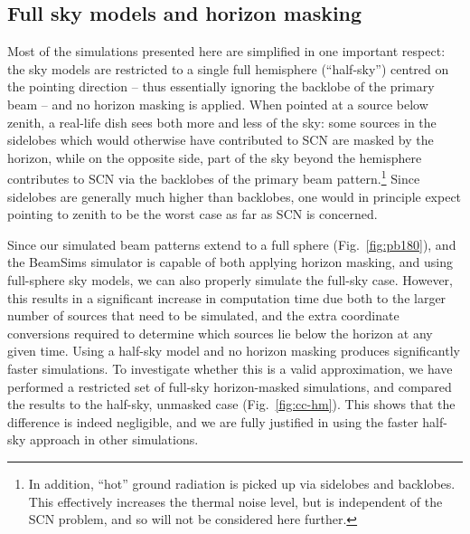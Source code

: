 \documentclass{aa}
\begin{document}
\subsection{Full sky models and horizon masking}
\label{sec:horizon-masking}

Most of the simulations presented here are simplified in one important respect: the sky models are restricted to a single full hemisphere (``half-sky'') centred on the pointing direction -- thus essentially ignoring the backlobe of the primary beam -- and no horizon masking is applied. When pointed at a source below zenith, a real-life dish sees both more and less of the sky: some sources in the sidelobes which would otherwise have contributed to SCN are masked by the horizon, while on the opposite side, part of the sky beyond the hemisphere contributes to SCN via the backlobes of the primary beam pattern.\footnote{In addition, ``hot'' ground radiation is picked up via sidelobes and backlobes. This effectively increases the thermal noise level, but is independent of the SCN problem, and so will not be considered here further.} Since sidelobes are generally much higher than backlobes, one would in principle expect pointing to zenith to be the worst case as far as SCN is concerned. 

Since our simulated beam patterns extend to a full sphere (Fig.~\ref{fig:pb180}), and the BeamSims simulator is capable of both applying horizon masking, and using full-sphere sky models, we can also properly simulate the full-sky case. However, this results in a significant increase in computation time due both to the larger number of sources that need to be simulated, and the extra coordinate conversions required to determine which sources lie below the horizon at any given time. Using a half-sky model and no horizon masking produces significantly faster simulations. To investigate whether this is a valid approximation, we have performed a restricted set of full-sky horizon-masked simulations, and compared the results to the half-sky, unmasked case (Fig.~\ref{fig:cc-hm}). This shows that the difference is indeed negligible, and we are fully justified in using the faster half-sky approach in other simulations. 
\end{document}
